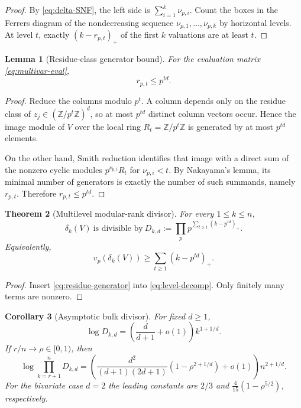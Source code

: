 \documentclass[11pt,oneside]{article}
\newtheorem{theorem}{Theorem}[section]
\newtheorem{lemma}[theorem]{Lemma}
\newtheorem{corollary}[theorem]{Corollary}
\theoremstyle{definition}
\theoremstyle{remark}
\newcommand{\Z}{\mathbb{Z}}
\begin{document}
\begin{proof}
By \eqref{eq:delta-SNF}, the left side is $\sum_{i=1}^k\nu_{p,i}$.  Count the boxes in the Ferrers diagram of the nondecreasing sequence $\nu_{p,1},\dots,\nu_{p,k}$ by horizontal levels.  At level $t$, exactly $(k-r_{p,t})_+$ of the first $k$ valuations are at least $t$.
\end{proof}

\begin{lemma}[Residue-class generator bound]
\label{lem:residue-generator}
For the evaluation matrix \eqref{eq:multivar-eval},
\begin{equation}
 r_{p,t}\le p^{td}.
 \label{eq:residue-generator}
\end{equation}
\end{lemma}

\begin{proof}
Reduce the columns modulo $p^t$.  A column depends only on the residue class of $z_j\in(\Z/p^t\Z)^d$, so at most $p^{td}$ distinct column vectors occur.  Hence the image module of $V$ over the local ring $R_t=\Z/p^t\Z$ is generated by at most $p^{td}$ elements.

On the other hand, Smith reduction identifies that image with a direct sum of the nonzero cyclic modules $p^{\nu_{p,i}}R_t$ for $\nu_{p,i}<t$.  By Nakayama's lemma, its minimal number of generators is exactly the number of such summands, namely $r_{p,t}$.  Therefore $r_{p,t}\le p^{td}$.
\end{proof}

\begin{theorem}[Multilevel modular-rank divisor]
\label{thm:modular-divisor}
For every $1\le k\le n$,
\begin{equation}
 \boxed{
 \delta_k(V)\ \text{is divisible by}\
 D_{k,d}:=\prod_p p^{\sum_{t\ge1}(k-p^{td})_+}.}
 \label{eq:Dkd}
\end{equation}
Equivalently,
\begin{equation}
 v_p(\delta_k(V))\ge\sum_{t\ge1}(k-p^{td})_+.
 \label{eq:modular-divisor-p}
\end{equation}
\end{theorem}

\begin{proof}
Insert \eqref{eq:residue-generator} into \eqref{eq:level-decomp}.  Only finitely many terms are nonzero.
\end{proof}

\begin{corollary}[Asymptotic bulk divisor]
\label{cor:Dkd-asymptotic}
For fixed $d\ge1$,
\begin{equation}
 \log D_{k,d}
 =\left(\frac{d}{d+1}+o(1)\right)k^{1+1/d}.
 \label{eq:Dkd-asymptotic}
\end{equation}
If $r/n\to\rho\in[0,1)$, then
\begin{equation}
 \log\prod_{k=r+1}^n D_{k,d}
 =\left(
 \frac{d^2}{(d+1)(2d+1)}(1-\rho^{2+1/d})+o(1)
 \right)n^{2+1/d}.
 \label{eq:Dprofile-asymptotic}
\end{equation}
For the bivariate case $d=2$ the leading constants are $2/3$ and
$\frac4{15}(1-\rho^{5/2})$, respectively.
\end{corollary}
\end{document}
